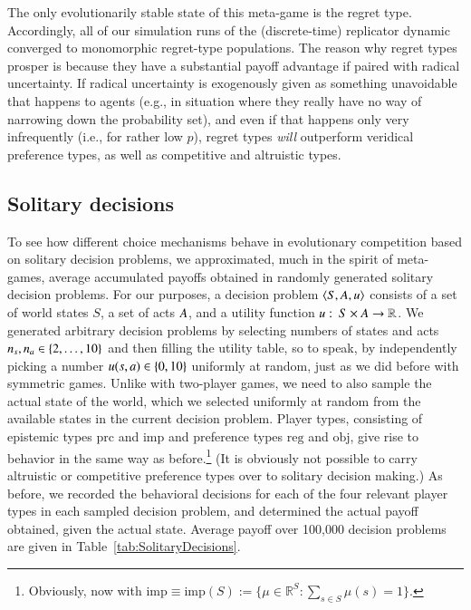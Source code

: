 \documentclass[fleqn,reqno,11pt]{article}
\begin{document}
The only evolutionarily stable state of this meta-game is the regret type. Accordingly, all of
our simulation runs of the (discrete-time) replicator dynamic converged to monomorphic
regret-type populations. The reason why regret types prosper is because they have a substantial
payoff advantage if paired with radical uncertainty. If radical uncertainty is exogenously
given as something unavoidable that happens to agents (e.g., in situation where they really have no
way of narrowing down the probability set), and even if that happens only very
infrequently (i.e., for rather low $p$), regret types \emph{will} outperform veridical
preference types, as well as competitive and altruistic types.


\subsection{Solitary decisions}
\label{sec:solitary-decisions}


To see how different choice mechanisms behave in evolutionary competition based on solitary decision
problems, we approximated, much in the spirit of meta-games, average accumulated payoffs
obtained in randomly generated solitary decision problems. For our purposes, a decision problem
$\left \langle S, A, u\right\rangle$ consists of a set of world states $S$, a set of acts
$A$, and a utility function $u \thinspace \colon \thinspace S \times A \rightarrow
\mathbb{R}$.
We generated arbitrary decision problems by selecting numbers of states and acts
$n_s, n_a \in \left\{2, \dots, 10\right\}$ and then filling the utility table, so to speak, by
independently picking a number $u(s, a) \in \left\{0, 10\right\}$ uniformly at random, just
as we did before with symmetric games. Unlike with two-player games, we need to also sample the
actual state of the world, which we selected uniformly at random from the available states in
the current decision problem. Player types, consisting of epistemic types $\text{prc}$ and
$\text{imp}$ and preference types $\text{reg}$ and $\text{obj}$, give rise to behavior in
the same way as before.\footnote{Obviously, now with $ \text{imp} \equiv \text{imp}(S) :=\lbrace \mu \in \mathbb{R}^{S}: \sum_{s \in S} \mu(s) = 1 \rbrace$.} (It is obviously not possible to carry altruistic or competitive
preference types over to solitary decision making.) As before, we recorded the behavioral
decisions for each of the four relevant player types in each sampled decision problem, and
determined the actual payoff obtained, given the actual state. Average payoff over 100,000 decision
problems are given in Table~\ref{tab:SolitaryDecisions}.
\end{document}
